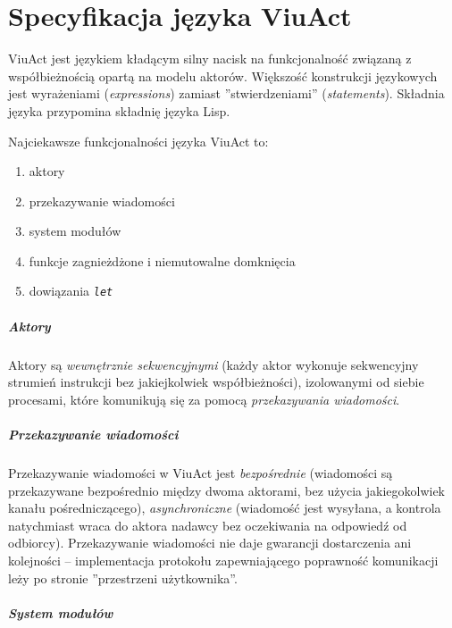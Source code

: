 \chapter{Specyfikacja języka ViuAct}
\label{viuact_spec}
\label{specyfikacja_jezyka_viuact} %

ViuAct jest językiem kładącym silny nacisk na funkcjonalność związaną z współbieżnością opartą na modelu
aktorów. Większość konstrukcji językowych jest wyrażeniami (\emph{expressions}) zamiast ''stwierdzeniami''
(\emph{statements}). Składnia języka przypomina składnię języka Lisp.

Najciekawsze funkcjonalności języka ViuAct to:

\begin{enumerate}
    \item aktory
    \item przekazywanie wiadomości
    \item system modułów
    \item funkcje zagnieżdżone i niemutowalne domknięcia
    \item dowiązania \emph{\texttt{let}}
\end{enumerate}

\paragraph*{Aktory}

Aktory są \emph{wewnętrznie sekwencyjnymi} (każdy aktor wykonuje sekwencyjny strumień instrukcji bez
jakiejkolwiek współbieżności), izolowanymi od siebie procesami, które komunikują się za pomocą
\emph{przekazywania wiadomości}.

\paragraph*{Przekazywanie wiadomości}

Przekazywanie wiadomości w ViuAct jest \emph{bezpośrednie} (wiadomości są przekazywane bezpośrednio między
dwoma aktorami, bez użycia jakiegokolwiek kanału pośredniczącego), \emph{asynchroniczne} (wiadomość jest
wysyłana, a kontrola natychmiast wraca do aktora nadawcy bez oczekiwania na odpowiedź od odbiorcy).
Przekazywanie wiadomości nie daje gwarancji dostarczenia ani kolejności -- implementacja protokołu
zapewniającego poprawność komunikacji leży po stronie ''przestrzeni użytkownika''.

\paragraph*{System modułów}

